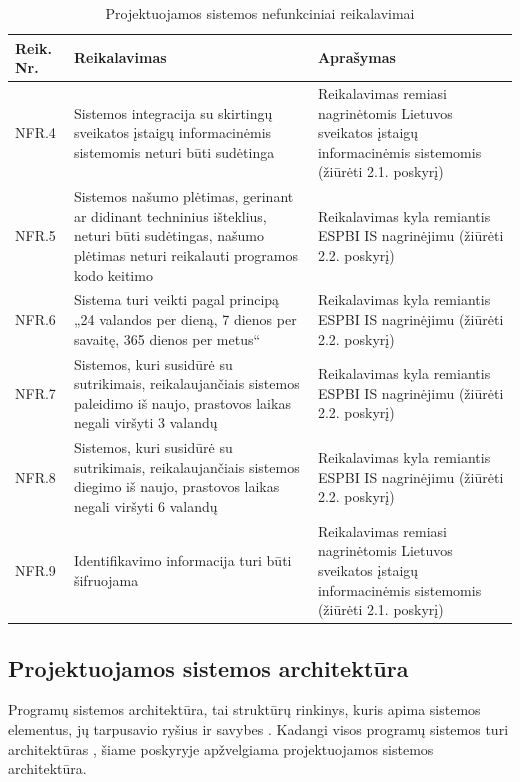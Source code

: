 \begin{table}[!ht]
    \centering
    \renewcommand{\arraystretch}{1.2}
    \renewcommand\thetable{6}

    \begin{tabular}{|m{3em}|m{17em}|m{17em}|}
    \hline 
    \rowcolor[HTML]{EFEFEF} 
    Reik. Nr. & Reikalavimas & Aprašymas \\ \hline
   
    NFR.4  &  Sistemos integracija su skirtingų sveikatos įstaigų informacinėmis sistemomis neturi būti sudėtinga  &   Reikalavimas remiasi nagrinėtomis Lietuvos sveikatos įstaigų informacinėmis sistemomis (žiūrėti 2.1. poskyrį)       \\ \hline
    NFR.5  &  Sistemos našumo plėtimas, gerinant ar didinant techninius išteklius, neturi būti sudėtingas, našumo plėtimas neturi reikalauti programos kodo keitimo  &   Reikalavimas kyla remiantis ESPBI IS nagrinėjimu (žiūrėti 2.2. poskyrį)       \\ \hline
    NFR.6  &   Sistema turi veikti pagal principą „24 valandos per dieną, 7 dienos per savaitę, 365 dienos per metus“  &  Reikalavimas kyla remiantis ESPBI IS nagrinėjimu (žiūrėti 2.2. poskyrį)       \\ \hline
    NFR.7  &  Sistemos, kuri susidūrė su sutrikimais, reikalaujančiais sistemos paleidimo iš naujo, prastovos laikas negali viršyti 3 valandų  &   Reikalavimas kyla remiantis ESPBI IS nagrinėjimu (žiūrėti 2.2. poskyrį)       \\ \hline
    NFR.8  &  Sistemos, kuri susidūrė su sutrikimais, reikalaujančiais sistemos diegimo iš naujo, prastovos laikas negali viršyti 6 valandų  &   Reikalavimas kyla remiantis ESPBI IS nagrinėjimu (žiūrėti 2.2. poskyrį)       \\ \hline
    NFR.9  &  Identifikavimo informacija turi būti šifruojama  &   Reikalavimas remiasi nagrinėtomis Lietuvos sveikatos įstaigų informacinėmis sistemomis (žiūrėti 2.1. poskyrį)       \\ \hline
    \end{tabular}
    \caption{Projektuojamos sistemos nefunkciniai reikalavimai} 

\end{table}

\subsection{Projektuojamos sistemos architektūra}
Programų sistemos architektūra, tai struktūrų rinkinys, kuris apima sistemos elementus, jų tarpusavio ryšius ir savybes \cite{Bass2013}. Kadangi visos programų sistemos turi architektūras \cite{Bass2013}, šiame poskyryje apžvelgiama projektuojamos sistemos architektūra.

